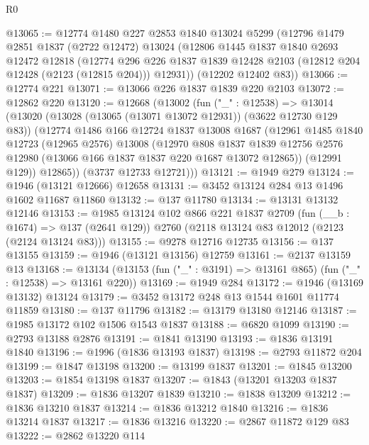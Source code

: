\begin{lexlean}{R0}
\begin{coremodule}
@13065 := @12774
    @1480
    @227
    @2853
    @1840
    @13024
    @5299
    (@12796
      @1479
      @2851
      @1837
      (@2722 @12472)
      @13024
      (@12806
        @1445
        @1837
        @1840
        @2693
        @12472
        @12818
        (@12774
          @296
          @226
          @1837
          @1839
          @12428
          @2103
          (@12812 @204 @12428 (@2123 (@12815 @204)))
          @12931))
      (@12202 @12402 @83))
@13066 := @12774 @221
@13071 := @13066 @226 @1837 @1839 @220 @2103
@13072 := @12862 @220
@13120 := @12668
    (@13002
      (fun ("_" : @12538) =>
      @13014
        (@13020
          (@13028 (@13065 (@13071 @13072 @12931)) (@3622 @12730 @129 @83))
          (@12774
            @1486
            @166
            @12724
            @1837
            @13008
            @1687
            (@12961
              @1485
              @1840
              @12723
              (@12965 @2576)
              @13008
              (@12970
                @808
                @1837
                @1839
                @12756
                @2576
                @12980
                (@13066 @166 @1837 @1837 @220 @1687 @13072 @12865))
              (@12991 @129))
            @12865))
        (@3737 @12733 @12721)))
@13121 := @1949 @279
@13124 := @1946 (@13121 @12666) @12658
@13131 := @3452 @13124 @284 @13 @1496 @1602 @11687 @11860
@13132 := @137 @11780
@13134 := @13131 @13132 @12146
@13153 := @1985
    @13124
    @102
    @866
    @221
    @1837
    @2709
    (fun (__b : @1674) => @137 (@2641 @129))
    @2760
    (@2118 @13124 @83 @12012 (@2123 (@2124 @13124 @83)))
@13155 := @9278 @12716 @12735
@13156 := @137 @13155
@13159 := @1946 (@13121 @13156) @12759
@13161 := @2137 @13159 @13
@13168 := @13134 (@13153 (fun ("_" : @3191) => @13161 @865) (fun ("_" : @12538) => @13161 @220))
@13169 := @1949 @284
@13172 := @1946 (@13169 @13132) @13124
@13179 := @3452 @13172 @248 @13 @1544 @1601 @11774 @11859
@13180 := @137 @11796
@13182 := @13179 @13180 @12146
@13187 := @1985 @13172 @102 @1506 @1543 @1837
@13188 := @6820 @1099
@13190 := @2793 @13188 @2876
@13191 := @1841 @13190
@13193 := @1836 @13191 @1840
@13196 := @1996 (@1836 @13193 @1837)
@13198 := @2793 @11872 @204
@13199 := @1847 @13198
@13200 := @13199 @1837
@13201 := @1845 @13200
@13203 := @1854 @13198 @1837
@13207 := @1843 (@13201 @13203 @1837 @1837)
@13209 := @1836 @13207 @1839
@13210 := @1838 @13209
@13212 := @1836 @13210 @1837
@13214 := @1836 @13212 @1840
@13216 := @1836 @13214 @1837
@13217 := @1836 @13216
@13220 := @2867 @11872 @129 @83
@13222 := @2862 @13220 @114

\end{coremodule}
\end{lexlean}
